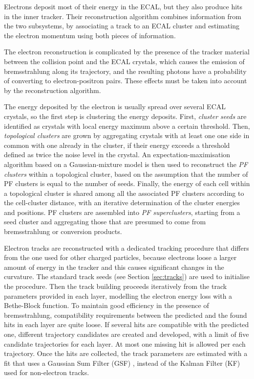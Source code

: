 Electrons deposit most of their energy in the ECAL, but they also produce hits in the inner tracker.
Their reconstruction algorithm combines information from the two subsystems,
by associating a track to an ECAL cluster and estimating the electron momentum using both pieces of information.

The electron reconstruction is complicated by the presence of the tracker material between the collision point and the ECAL crystals,
which causes the emission of bremsstrahlung along its trajectory, and the resulting photons have a probability of converting to electron-positron pairs.
These effects must be taken into account by the reconstruction algorithm.

The energy deposited by the electron is usually spread over several ECAL crystals, so the first step is clustering the energy deposits.
First, \textit{cluster seeds} are identified as crystals with local energy maximum above a certain threshold.
Then, \textit{topological clusters} are grown by aggregating crystals with at least one one side in common with one already in the cluster,
if their energy exceeds a threshold defined as twice the noise level in the crystal.
An expectation-maximisation algorithm based on a Gaussian-mixture model is then used to reconstruct the \textit{PF clusters} within a topological cluster,
based on the assumption that the number of PF clusters is equal to the number of seeds.
Finally, the energy of each cell within a topological cluster is shared among all the associated PF clusters according to the cell-cluster distance,
with an iterative determination of the cluster energies and positions.
PF clusters are assembled into \textit{PF superclusters}, starting from a seed cluster and aggregating those that are presumed to come from bremsstrahlung or conversion products.

Electron tracks are reconstructed with a dedicated tracking procedure that differs from the one used for other charged particles,
because electrons loose a larger amount of energy in the tracker and this causes significant changes in the curvature.
The standard track seeds (see Section \ref{sec:tracks}) are used to initialise the procedure.
Then the track building proceeds iteratively from the track parameters provided in each layer, modelling the electron energy loss with a Bethe-Block function.
To maintain good efficiency in the presence of bremsstrahlung, compatibility requirements between the predicted and the found hits in each layer are quite loose.
If several hits are compatible with the predicted one, different trajectory candidates are created and developed,
with a limit of five candidate trajectories for each layer.
At most one missing hit is allowed per each trajectory.
Once the hits are collected, the track parameters are estimated with a fit that uses a Gaussian Sum Filter (GSF) \cite{CMS-NOTE-2005-001},
instead of the Kalman Filter (KF) \cite{billoir.qian:simultaneous} used for non-electron tracks.

